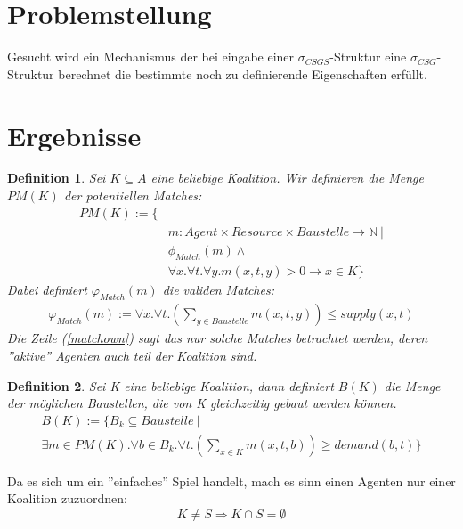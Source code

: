 \documentclass[12pt]{article}
\theoremstyle{break}
\newtheorem{definition}{Definition}
\begin{document}
\section{Problemstellung}

Gesucht wird ein Mechanismus der bei eingabe einer $\sigma_{CSGS}$-Struktur eine $\sigma_{CSG}$-Struktur berechnet die bestimmte noch zu definierende Eigenschaften erfüllt.

\section{Ergebnisse}

\begin{definition}
  Sei $K\subseteq A$ eine beliebige Koalition. Wir definieren die Menge $PM(K)$ der potentiellen Matches:
  \begin{eqnarray}
    PM(K) := \{ &\\
    &m: Agent\times Resource \times Baustelle \rightarrow \mathbb{N}\ |\\
    & \phi_{Match}(m) \land \\ & \forall x.\forall t.\forall y. m(x,t, y) > 0 \rightarrow x\in K\} \label{matchown}
  \end{eqnarray}
  Dabei definiert $\varphi_{Match}(m)$ die validen Matches:
  \begin{eqnarray}
    \varphi_{Match}(m) := \forall x.\forall t.(\sum_{y\in Baustelle} m(x,t,y))\leq supply(x,t)
  \end{eqnarray}
  Die Zeile (\ref{matchown}) sagt das nur solche Matches betrachtet werden, deren ''aktive'' Agenten auch teil der Koalition sind.
\end{definition}

\begin{definition}
  Sei K eine beliebige Koalition, dann definiert $B(K)$ die Menge der möglichen Baustellen, die von K gleichzeitig gebaut werden können.
  \begin{eqnarray}
    B(K) := \{ B_k\subseteq Baustelle\ |\\
    \exists m\in PM(K).\forall b\in B_k.\forall t.(\sum_{x\in K}m(x,t,b))\geq demand(b, t)\}
  \end{eqnarray}
\end{definition}

Da es sich um ein ''einfaches'' Spiel handelt, mach es sinn einen Agenten nur einer Koalition zuzuordnen:
\begin{equation}
  K\neq S \Rightarrow K\cap S =\emptyset \label{koalitiondisjunct}
\end{equation}
\end{document}

